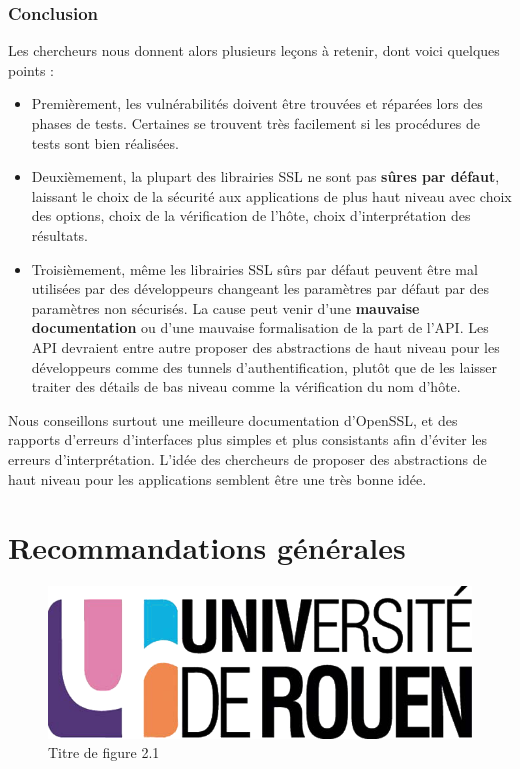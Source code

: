 		\subsubsection{Conclusion}

			Les chercheurs nous donnent alors plusieurs leçons à retenir, dont voici quelques points :
			\begin{itemize}
			\item Premièrement, les vulnérabilités doivent être trouvées et réparées lors des phases de tests. Certaines se trouvent très facilement si les procédures de tests sont bien réalisées. 
			\item Deuxièmement, la plupart des librairies SSL ne sont pas \textbf{sûres par défaut}, laissant le choix de la sécurité aux applications de plus haut niveau avec choix des options, choix de la vérification de l'hôte, choix d'interprétation des résultats.
			\item Troisièmement, même les librairies SSL sûrs par défaut peuvent être mal utilisées par des développeurs changeant les paramètres par défaut par des paramètres non sécurisés. La cause peut venir d'une \textbf{mauvaise documentation} ou d'une mauvaise formalisation de la part de l'API. Les API devraient entre autre proposer des abstractions de haut niveau pour les développeurs comme des tunnels d'authentification, plutôt que de les laisser traiter des détails de bas niveau comme la vérification du nom d'hôte.\\
			\end{itemize}

			Nous conseillons surtout une meilleure documentation d'OpenSSL, et des rapports d'erreurs d'interfaces plus simples et plus consistants afin d'éviter les erreurs d'interprétation. L'idée des chercheurs de proposer des abstractions de haut niveau pour les applications semblent être une très bonne idée.
		
		


\section{Recommandations générales}




\begin{figure}[H]
	\centering
	\includegraphics[scale=0.2]{images/logo_univ.png}
	\caption{Titre de figure 2.1}
	\label{fig21}
\end{figure}